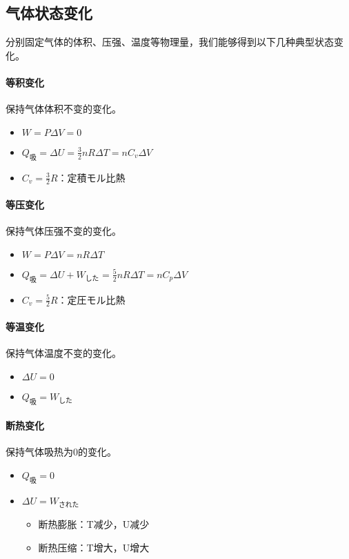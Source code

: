 \subsection{气体状态变化}

分别固定气体的体积、压强、温度等物理量，我们能够得到以下几种典型状态变化。

\paragraph{等积变化}保持气体体积不变的变化。
\begin{itemize}
    \item $W=P\Delta V=0$
    \item $Q_\textrm{吸}=\Delta U=\frac32nR\Delta T=nC_v\Delta V$
    \item $C_v=\frac32R$：定積モル比熱
\end{itemize}

\paragraph{等压变化}保持气体压强不变的变化。
\begin{itemize}
    \item $W=P\Delta V=nR\Delta T$
    \item $Q_\textrm{吸}=\Delta U+W_\textrm{した}=\frac52nR\Delta T=nC_p\Delta V$
    \item $C_v=\frac52R$：定圧モル比熱
\end{itemize}

\paragraph{等温变化}保持气体温度不变的变化。
\begin{itemize}
    \item $\Delta U=0$
    \item $Q_\textrm{吸}=W_\textrm{した}$
\end{itemize}

\paragraph{断热变化}保持气体吸热为0的变化。
\begin{itemize}
    \item $Q_\textrm{吸}=0$
    \item $\Delta U=W_\textrm{された}$
    \begin{itemize}
        \item 断热膨胀：T减少，U减少
        \item 断热压缩：T增大，U增大
    \end{itemize}
\end{itemize}

